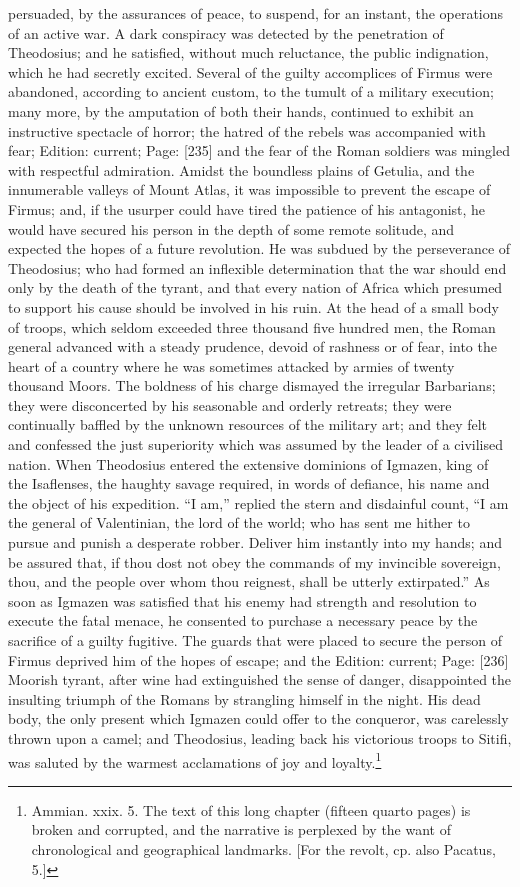 persuaded, by the assurances of peace, to suspend, for an instant, the operations of an active war. A dark conspiracy was detected by the penetration of Theodosius; and he satisfied, without much reluctance, the public indignation, which he had secretly excited. Several of the guilty accomplices of Firmus were abandoned, according to ancient custom, to the tumult of a military execution; many more, by the amputation of both their hands, continued to exhibit an instructive spectacle of horror; the hatred of the rebels was accompanied with fear; Edition: current; Page: [235] and the fear of the Roman soldiers was mingled with respectful admiration. Amidst the boundless plains of Getulia, and the innumerable valleys of Mount Atlas, it was impossible to prevent the escape of Firmus; and, if the usurper could have tired the patience of his antagonist, he would have secured his person in the depth of some remote solitude, and expected the hopes of a future revolution. He was subdued by the perseverance of Theodosius; who had formed an inflexible determination that the war should end only by the death of the tyrant, and that every nation of Africa which presumed to support his cause should be involved in his ruin. At the head of a small body of troops, which seldom exceeded three thousand five hundred men, the Roman general advanced with a steady prudence, devoid of rashness or of fear, into the heart of a country where he was sometimes attacked by armies of twenty thousand Moors. The boldness of his charge dismayed the irregular Barbarians; they were disconcerted by his seasonable and orderly retreats; they were continually baffled by the unknown resources of the military art; and they felt and confessed the just superiority which was assumed by the leader of a civilised nation. When Theodosius entered the extensive dominions of Igmazen, king of the Isaflenses, the haughty savage required, in words of defiance, his name and the object of his expedition. \texthebrew{“}I am,\texthebrew{}” replied the stern and disdainful count, \texthebrew{“}I am the general of Valentinian, the lord of the world; who has sent me hither to pursue and punish a desperate robber. Deliver him instantly into my hands; and be assured that, if thou dost not obey the commands of my invincible sovereign, thou, and the people over whom thou reignest, shall be utterly extirpated.\texthebrew{}” As soon as Igmazen was satisfied that his enemy had strength and resolution to execute the fatal menace, he consented to purchase a necessary peace by the sacrifice of a guilty fugitive. The guards that were placed to secure the person of Firmus deprived him of the hopes of escape; and the Edition: current; Page: [236] Moorish tyrant, after wine had extinguished the sense of danger, disappointed the insulting triumph of the Romans by strangling himself in the night. His dead body, the only present which Igmazen could offer to the conqueror, was carelessly thrown upon a camel; and Theodosius, leading back his victorious troops to Sitifi, was saluted by the warmest acclamations of joy and loyalty.\footnote{Ammian. xxix. 5. The text of this long chapter (fifteen quarto pages) is broken and corrupted, and the narrative is perplexed by the want of chronological and geographical landmarks. [For the revolt, cp. also Pacatus, 5.]}

